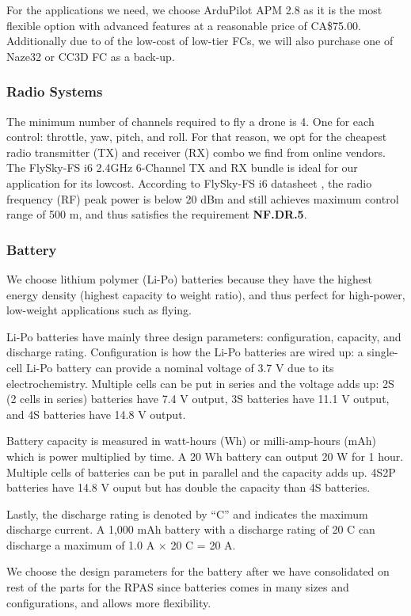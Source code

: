 For the applications we need, we choose ArduPilot APM 2.8 as it is the most flexible option with advanced features at a reasonable price of CA\$75.00. Additionally due to of the low-cost of low-tier FCs, we will also purchase one of Naze32 or CC3D FC as a back-up.

\subsubsection{Radio Systems}

The minimum number of channels required to fly a drone is 4. One for each control: throttle, yaw, 
pitch, and roll. For that reason, we opt for the cheapest radio transmitter (TX) and receiver  (RX) 
combo we find from online vendors. 
The FlySky-FS i6 2.4GHz 6-Channel TX and RX bundle is ideal for our application for its lowcost.
According to FlySky-FS i6 datasheet\cite{flyskyi6} , the radio frequency (RF) peak power is below 20 dBm and still achieves maximum control range of 500 m, and thus satisfies the requirement \textbf{NF.DR.5}.

\subsubsection{Battery}

We choose lithium polymer (Li-Po) batteries because they have the highest energy density (highest 
capacity to weight ratio), and thus perfect for high-power, low-weight applications such as flying. 

Li-Po batteries have mainly three design parameters: configuration, capacity, and discharge rating. 
Configuration is how the Li-Po batteries are wired up: a single-cell Li-Po battery can provide a 
nominal voltage of 3.7 V due to its electrochemistry. Multiple cells can be put in series and the 
voltage adds up: 2S (2 cells in series) batteries have 7.4 V output, 3S batteries have 11.1 V output,
 and 4S batteries have 14.8 V output.

Battery capacity is measured in watt-hours (Wh) or milli-amp-hours (mAh) which is power multiplied by time. A 20 Wh battery can output 20 W for 1 hour. Multiple cells of batteries can be put in parallel and the capacity adds up. 4S2P batteries have 14.8 V ouput but has double the capacity than 4S batteries.

Lastly, the discharge rating is denoted by “C” and indicates the maximum discharge current. A 1,000 
mAh battery with a discharge rating of 20 C can discharge a maximum of 1.0 A $\times$ 20 C = 20 A.

We choose the design parameters for the battery after we have consolidated on rest of the parts for the RPAS since batteries comes in many sizes and configurations, and allows more flexibility.
